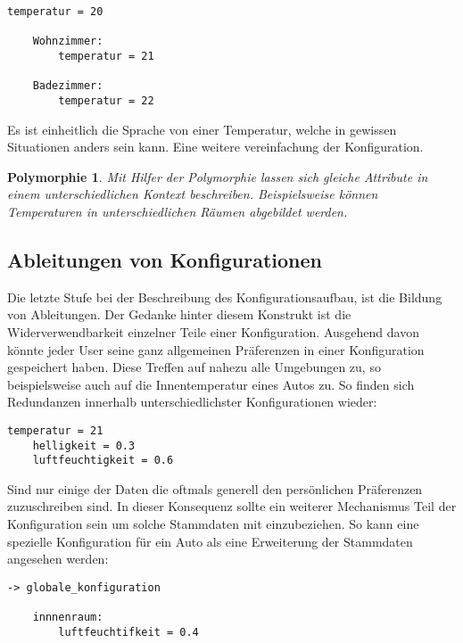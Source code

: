 \lstset{language=bash}
\begin{lstlisting}[caption=Beispiel einer Polymporphie basierten Konfiguration, captionpos=b]
  temperatur = 20
	
	Wohnzimmer: 
		temperatur = 21
	
	Badezimmer: 
		temperatur = 22

\end{lstlisting}

Es ist einheitlich die Sprache von einer Temperatur, welche in gewissen Situationen anders sein kann. Eine weitere vereinfachung der Konfiguration.

\newtheorem{mydef}{Polymorphie}
\begin{mydef}
Mit Hilfer der Polymorphie lassen sich gleiche Attribute in einem unterschiedlichen Kontext beschreiben. Beispielsweise können Temperaturen in unterschiedlichen Räumen abgebildet werden.
\end{mydef}

\subsection{Ableitungen von Konfigurationen}
Die letzte Stufe bei der Beschreibung des Konfigurationsaufbau, ist die Bildung von Ableitungen. Der Gedanke hinter diesem Konstrukt ist die Widerverwendbarkeit einzelner Teile einer Konfiguration. Ausgehend davon könnte jeder User seine ganz allgemeinen Präferenzen in einer Konfiguration gespeichert haben. Diese Treffen auf nahezu alle Umgebungen zu, so beispielsweise auch auf die Innentemperatur eines Autos zu. So finden sich Redundanzen innerhalb unterschiedlichster Konfigurationen wieder:
\lstset{language=bash}
\begin{lstlisting}[caption=Globale Attribute einer Konfiguration, captionpos=b]
	temperatur = 21
	helligkeit = 0.3
	luftfeuchtigkeit = 0.6

\end{lstlisting}

Sind nur einige der Daten die oftmals generell den persönlichen Präferenzen zuzuschreiben sind. In dieser Konsequenz sollte ein weiterer Mechanismus Teil der Konfiguration sein um solche Stammdaten mit einzubeziehen. So kann eine spezielle Konfiguration für ein Auto als eine Erweiterung der Stammdaten angesehen werden:
\lstset{language=bash}
\begin{lstlisting}[caption=Ableitung der Globalkonfiguration, captionpos=b]
	-> globale_konfiguration
	
	innnenraum:
		luftfeuchtifkeit = 0.4

\end{lstlisting}

